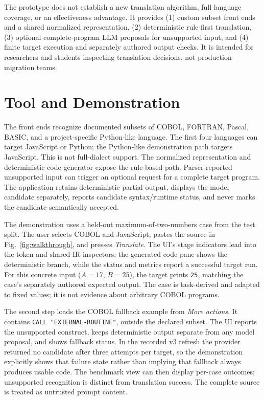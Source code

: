 \documentclass[10pt,conference]{IEEEtran}
\begin{document}
The prototype does not establish a new translation algorithm, full language coverage,
or an effectiveness advantage. It provides (1) custom subset front ends and a shared
normalized representation, (2) deterministic rule-first translation, (3) optional
complete-program LLM proposals for unsupported input, and (4) finite target execution
and separately authored output checks. It is intended for researchers and students
inspecting translation decisions, not production migration teams.

\section{Tool and Demonstration}
The front ends recognize documented subsets of COBOL, FORTRAN, Pascal, BASIC, and a
project-specific Python-like language. The first four languages can target JavaScript or
Python; the Python-like demonstration path targets JavaScript. This is not full-dialect
support. The normalized representation and deterministic code generator expose the
rule-based path. Parser-reported unsupported input can trigger an optional request for
a complete target program. The application retains deterministic partial output,
displays the model candidate separately, reports candidate syntax/runtime status, and
never marks the candidate semantically accepted.

The demonstration uses a held-out maximum-of-two-numbers case from the test split.
The user selects COBOL and JavaScript, pastes the source in Fig.~\ref{fig:walkthrough},
and presses \emph{Translate}. The UI's stage indicators lead into the token and shared-IR
inspectors; the generated-code pane shows the deterministic branch, while the status
and metrics report a successful target run. For this concrete input ($A=17$, $B=25$),
the target prints \texttt{25}, matching the case's separately authored expected output.
The case is task-derived and adapted to fixed values; it is not evidence about arbitrary
COBOL programs.

The second step loads the COBOL fallback example from \emph{More actions}. It contains
\texttt{CALL "EXTERNAL-ROUTINE"}, outside the declared subset. The UI reports the
unsupported construct, keeps deterministic output separate from any model proposal,
and shows fallback status. In the recorded v3 refresh the provider returned no
candidate after three attempts per target, so the demonstration explicitly shows that
failure state rather than implying that fallback always produces usable code. The
benchmark view can then display per-case outcomes; unsupported recognition is distinct
from translation success. The complete source is treated as untrusted prompt content.
\end{document}
